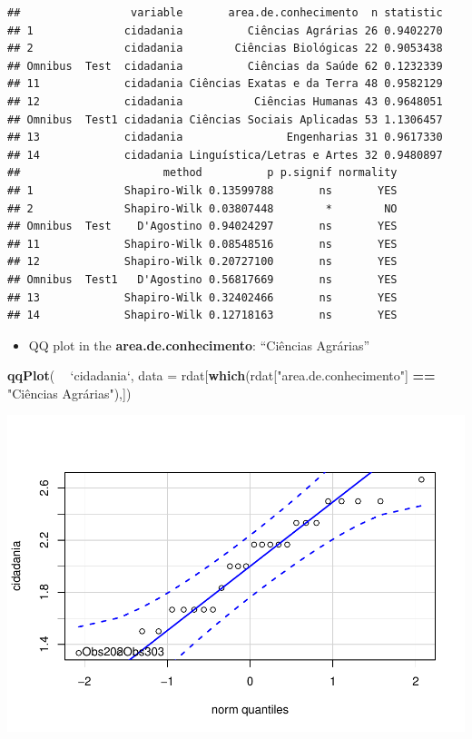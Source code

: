 \documentclass[]{article}
\newenvironment{Shaded}{\begin{snugshade}}{\end{snugshade}}
\newcommand{\DataTypeTok}[1]{\textcolor[rgb]{0.13,0.29,0.53}{#1}}
\newcommand{\KeywordTok}[1]{\textcolor[rgb]{0.13,0.29,0.53}{\textbf{#1}}}
\newcommand{\NormalTok}[1]{#1}
\newcommand{\OperatorTok}[1]{\textcolor[rgb]{0.81,0.36,0.00}{\textbf{#1}}}
\newcommand{\StringTok}[1]{\textcolor[rgb]{0.31,0.60,0.02}{#1}}
\providecommand{\tightlist}{%
  \setlength{\itemsep}{0pt}\setlength{\parskip}{0pt}}
\begin{document}
\begin{verbatim}
##                 variable       area.de.conhecimento  n statistic
## 1              cidadania          Ciências Agrárias 26 0.9402270
## 2              cidadania        Ciências Biológicas 22 0.9053438
## Omnibus  Test  cidadania          Ciências da Saúde 62 0.1232339
## 11             cidadania Ciências Exatas e da Terra 48 0.9582129
## 12             cidadania           Ciências Humanas 43 0.9648051
## Omnibus  Test1 cidadania Ciências Sociais Aplicadas 53 1.1306457
## 13             cidadania                Engenharias 31 0.9617330
## 14             cidadania Linguística/Letras e Artes 32 0.9480897
##                      method          p p.signif normality
## 1              Shapiro-Wilk 0.13599788       ns       YES
## 2              Shapiro-Wilk 0.03807448        *        NO
## Omnibus  Test    D'Agostino 0.94024297       ns       YES
## 11             Shapiro-Wilk 0.08548516       ns       YES
## 12             Shapiro-Wilk 0.20727100       ns       YES
## Omnibus  Test1   D'Agostino 0.56817669       ns       YES
## 13             Shapiro-Wilk 0.32402466       ns       YES
## 14             Shapiro-Wilk 0.12718163       ns       YES
\end{verbatim}

\begin{itemize}
\tightlist
\item
  QQ plot in the \textbf{area.de.conhecimento}: ``Ciências Agrárias''
\end{itemize}

\begin{Shaded}
\begin{Highlighting}[]
\KeywordTok{qqPlot}\NormalTok{( }\OperatorTok{~}\StringTok{ `}\DataTypeTok{cidadania}\StringTok{`}\NormalTok{, }\DataTypeTok{data =}\NormalTok{ rdat[}\KeywordTok{which}\NormalTok{(rdat[}\StringTok{"area.de.conhecimento"}\NormalTok{] }\OperatorTok{==}\StringTok{ "Ciências Agrárias"}\NormalTok{),])}
\end{Highlighting}
\end{Shaded}

\includegraphics{factorialAnova_files/figure-latex/unnamed-chunk-9-1.pdf}
\end{document}
